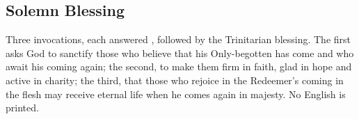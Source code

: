 \subsection{Solemn Blessing}
\label{proper-solemn-blessing}


\noindent Three invocations, each answered , followed by the
Trinitarian blessing. The first asks God to sanctify those who believe that
his Only-begotten has come and who await his coming again; the second, to
make them firm in faith, glad in hope and active in charity; the third, that
those who rejoice in the Redeemer's coming in the flesh may receive eternal
life when he comes again in majesty. No English is printed.
